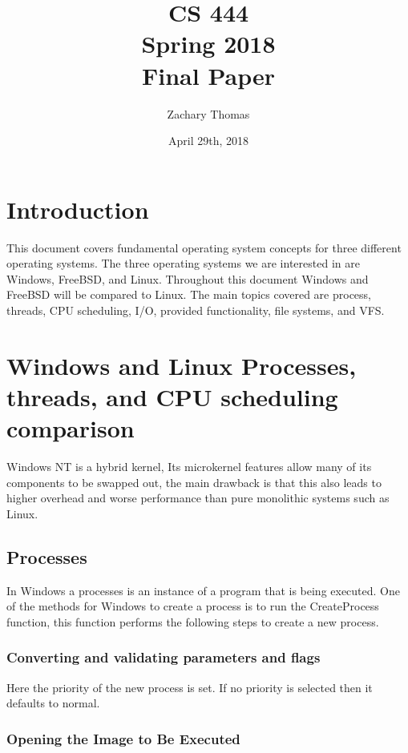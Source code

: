 \documentclass[letterpaper, 10pt, onecolumn, draftclsnofoot]{IEEEtran}
\title{CS 444 \\ Spring 2018  \\ Final Paper}
\author{Zachary Thomas}
\date{April 29th, 2018}
\begin{document}
	\begin{titlepage}
		\maketitle
	\end{titlepage}
\newpage
\tableofcontents
\newpage

\section{Introduction}

This document covers fundamental operating system concepts for three different operating systems. The three operating systems we are interested in are Windows, FreeBSD, and Linux. Throughout this document Windows and FreeBSD will be compared to Linux. The main topics covered are process, threads, CPU scheduling, I/O, provided functionality, file systems, and VFS.

\section{Windows and Linux Processes, threads, and CPU scheduling comparison}

Windows NT is a hybrid kernel, Its microkernel features allow many of its components to be swapped out, the main drawback is that this also leads to higher overhead and worse performance than pure monolithic systems such as Linux.\cite{wi_srv}

\subsection{Processes}

In Windows a processes is an instance of a program that is being executed. One of the methods for Windows to create a process is to run the CreateProcess function, this function performs the following steps to create a new process.\cite{wi_p1}

\subsubsection{Converting and validating parameters and flags}

Here the priority of the new process is set. If no priority is selected then it defaults to normal.\cite{wi_p1}

\subsubsection{Opening the Image to Be Executed}
\end{document}
